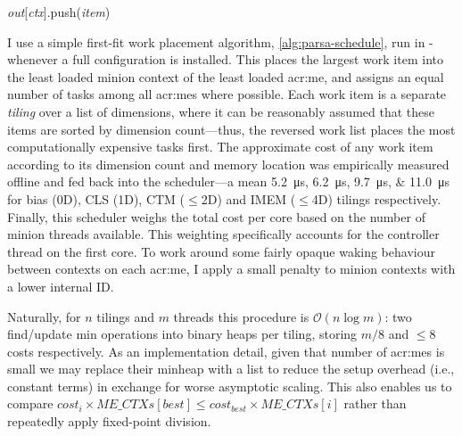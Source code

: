 \begin{algorithm}
{{			\emph{out}[\emph{ctx}].push(\emph{item})\;
		}
	}
\end{algorithm}

I use a simple first-fit work placement algorithm, \cref{alg:parsa-schedule}, run in \approachshort{}-\Coopfw{} whenever a full configuration is installed.
This places the largest work item into the least loaded minion context of the least loaded \gls{acr:me}, and assigns an equal number of tasks among all \glspl{acr:me} where possible.
Each work item is a separate \emph{tiling} over a list of dimensions, where it can be reasonably assumed that these items are sorted by dimension count---thus, the reversed work list places the most computationally expensive tasks first.
The approximate cost of any work item according to its dimension count and memory location was empirically measured offline and fed back into the scheduler---a mean \qtylist{5.2;6.2;9.7;11.0}{\micro\second} for bias (0D), CLS (1D), CTM ($\le$2D) and IMEM ($\le$4D) tilings respectively.
Finally, this scheduler weighs the total cost per core based on the number of minion threads available.
This weighting specifically accounts for the controller thread on the first core.
To work around some fairly opaque waking behaviour between contexts on each \gls{acr:me}, I apply a small penalty to minion contexts with a lower internal ID.

Naturally, for $n$ tilings and $m$ threads this procedure is $\mathcal{O}{\left(n\log{m}\right)}$: two find/update min operations into binary heaps per tiling, storing $m/8$ and $\le8$ costs respectively.
As an implementation detail, given that number of \glspl{acr:me} is small we may replace their minheap with a list to reduce the setup overhead (i.e., constant terms) in exchange for worse asymptotic scaling.
This also enables us to compare $\textit{cost}_i \times \textit{ME\_CTXs}\left[\textit{best}\right] \le \textit{cost}_\textit{best} \times \textit{ME\_CTXs}\left[i\right]$ rather than repeatedly apply fixed-point division.


